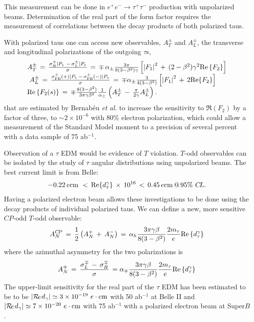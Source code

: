 This measurement can be done in $e^+ e^- \rightarrow \tau^+\tau^-$ production with unpolarized beams. Determination of the real part of the form factor requires the measurement of correlations between the decay products of both polarized taus. 

With polarized taus one can access new observables, $A_T^\pm$ and $A_L^\pm$, the transverse and longitudinal polarizations of the outgoing $\tau$s,
\[\begin{array}{l}
A_T^ \pm \, = \,\frac{{\sigma _R^ \pm |{P_e}\,\, - \,\sigma _L^ \pm |{P_e}}}{\sigma }\, = \, \mp \,{\alpha _ \pm }\frac{{3\pi }}{{8(3 - {\beta ^2})\gamma }}\left[ {{{\left| {{F_1}} \right|}^2}\, + \,(2 - {\beta ^2}){\gamma ^2}{\mathop{\rm Re}\nolimits} \left\{ {{F_2}} \right\}} \right]\\
\,\,A_L^ \pm \, = \,\frac{{\sigma _{{\rm{FB}}}^ \pm ( + )|{P_e}\, - \,\sigma _{{\rm{FB}}}^ \pm ( - )|{P_e}}}{\sigma }\, = \, \mp {\alpha _ \pm }\frac{3}{{4(3 - {\beta ^2})}}\left[ {{{\left| {{F_1}} \right|}^2}\, + \,2{\mathop{\rm Re}\nolimits} \{ {F_2}\} } \right]\\
{\rm{                  Re}}\left\{ {{F_2}(s)} \right\}\, = \, \mp \frac{{8(3 - {\beta ^2})}}{{3\pi \gamma {\beta ^2}}}\frac{1}{{{\alpha _ \pm }}}\left( {A_T^ \pm \, - \,\frac{\pi }{{2\gamma }}A_L^ \pm } \right).
\end{array}\]
that are estimated by
Bernab\'eu {\it et al.}\cite{ref:b1} to increase the sensitivity to
$\Re(F_2)$ by a factor of three, to $\sim2\times 10^{-6}$ with 80\%
electron polarization, which could allow a measurement of the Standard
Model moment to a precision of several percent with a data sample of
75 ab$^{-1}$. 

Observation of a $\tau$ EDM would be evidence of $T$ violation.  $T$-odd observables can be isolated by the study of $\tau$ angular
distributions using unpolarized beams. The best current limit is from Belle:
\vskip -12pt
\[ - 0.22\,e{\rm{cm}}\,\, < \,{\mathop{\rm Re}\nolimits} \{ d_\tau ^\gamma \} \, \times \,{10^{16}}\, < \,0.45\,e{\rm{cm}}\,@\,95\% \,\,C\!L.\]
\vskip -8pt
Having a polarized electron
beam allows these investigations to be done using the decay products
of individual polarized taus. We can define a new, more sensitive $C\!P$-odd $T$-odd observable:
\vskip -12pt
\[A_N^{C\!P}\, = \,\frac{1}{2}\left( {A_N^ + \, + \,A_N^ - } \right)\, = \,{\alpha _h}\frac{{3\pi \gamma \beta }}{{8(3 - {\beta ^2})}}\frac{{2{m_\tau }}}{e}{\mathop{\rm Re}\nolimits} \left\{ {d_\tau ^\gamma } \right\}\]
where the azimuthal asymmetry for the two polarizations is 
\[A_N^ \mp \, = \,\frac{{\sigma _L^ \mp \, - \,\sigma _R^ \mp }}{\sigma }\, = {\alpha _ \mp }\frac{{3\pi \gamma \beta }}{{8(3 - {\beta ^2})}}\frac{{2{m_\tau }}}{e}{\mathop{\rm Re}\nolimits} \left\{ {d_\tau ^\gamma } \right\}\]
\vskip -12pt
The upper-limit sensitivity for the real part of the
$\tau$ EDM has been estimated to be to be $|\Re{d_\gamma}|\simeq 3\times 10^{-19} \ e \cdot {\rm cm}$
with 50 ab$^{-1 }$ at Belle II and $|\Re{d_\gamma}|\simeq 7\times 10^{-20} \ e \cdot {\rm cm}$
with 75 ab$^{-1 }$ with a polarized electron beam at Super$B$\cite{ref:b2}.


